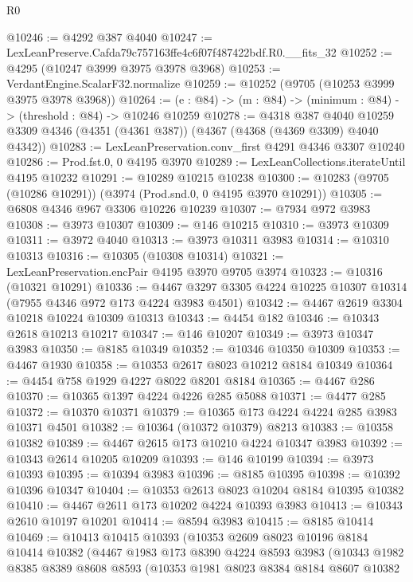 \begin{lexlean}{R0}
\begin{coremodule}
@10246 := @4292 @387 @4040
@10247 := LexLeanPreserve.Cafda79c757163ffe4c6f07f487422bdf.R0.__fits_32
@10252 := @4295 (@10247 @3999 @3975 @3978 @3968)
@10253 := VerdantEngine.ScalarF32.normalize
@10259 := @10252 (@9705 (@10253 @3999 @3975 @3978 @3968))
@10264 := (e : @84) -> (m : @84) -> (minimum : @84) -> (threshold : @84) -> @10246 @10259
@10278 := @4318
    @387
    @4040
    @10259
    @3309
    @4346
    (@4351 (@4361 @387))
    (@4367 (@4368 (@4369 @3309) @4040 @4342))
@10283 := LexLeanPreservation.conv_first @4291 @4346 @3307 @10240
@10286 := Prod.fst.{0, 0} @4195 @3970
@10289 := LexLeanCollections.iterateUntil @4195 @10232
@10291 := @10289 @10215 @10238
@10300 := @10283 (@9705 (@10286 @10291)) (@3974 (Prod.snd.{0, 0} @4195 @3970 @10291))
@10305 := @6808 @4346 @967 @3306 @10226 @10239
@10307 := @7934 @972 @3983
@10308 := @3973 @10307
@10309 := @146 @10215
@10310 := @3973 @10309
@10311 := @3972 @4040
@10313 := @3973 @10311 @3983
@10314 := @10310 @10313
@10316 := @10305 (@10308 @10314)
@10321 := LexLeanPreservation.encPair @4195 @3970 @9705 @3974
@10323 := @10316 (@10321 @10291)
@10336 := @4467 @3297 @3305 @4224 @10225 @10307 @10314 (@7955 @4346 @972 @173 @4224 @3983 @4501)
@10342 := @4467 @2619 @3304 @10218 @10224 @10309 @10313
@10343 := @4454 @182
@10346 := @10343 @2618 @10213 @10217
@10347 := @146 @10207
@10349 := @3973 @10347 @3983
@10350 := @8185 @10349
@10352 := @10346 @10350 @10309
@10353 := @4467 @1930
@10358 := @10353 @2617 @8023 @10212 @8184 @10349
@10364 := @4454 @758 @1929 @4227 @8022 @8201 @8184
@10365 := @4467 @286
@10370 := @10365 @1397 @4224 @4226 @285 @5088
@10371 := @4477 @285
@10372 := @10370 @10371
@10379 := @10365 @173 @4224 @4224 @285 @3983 @10371 @4501
@10382 := @10364 (@10372 @10379) @8213
@10383 := @10358 @10382
@10389 := @4467 @2615 @173 @10210 @4224 @10347 @3983
@10392 := @10343 @2614 @10205 @10209
@10393 := @146 @10199
@10394 := @3973 @10393
@10395 := @10394 @3983
@10396 := @8185 @10395
@10398 := @10392 @10396 @10347
@10404 := @10353 @2613 @8023 @10204 @8184 @10395 @10382
@10410 := @4467 @2611 @173 @10202 @4224 @10393 @3983
@10413 := @10343 @2610 @10197 @10201
@10414 := @8594 @3983
@10415 := @8185 @10414
@10469 := @10413
    @10415
    @10393
    (@10353
      @2609
      @8023
      @10196
      @8184
      @10414
      @10382
      (@4467
        @1983
        @173
        @8390
        @4224
        @8593
        @3983
        (@10343
          @1982
          @8385
          @8389
          @8608
          @8593
          (@10353
            @1981
            @8023
            @8384
            @8184
            @8607
            @10382

\end{coremodule}
\end{lexlean}
